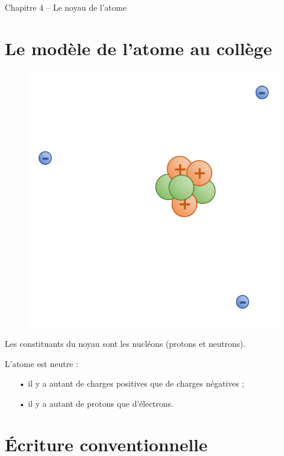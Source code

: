 \documentclass[12pt,a4paper]{article}
\begin{document}
\begin{header}
Chapitre 4 -- Le noyau de l'atome
\end{header}


\section{Le modèle de l'atome au collège}

\begin{figure}[h]
\center
\includegraphics[scale=0.85]{images/atome.png}
\end{figure}

Les constituants du noyau sont les nucléons (protons et neutrons).

L'atome est neutre :
\begin{itemize}
\item[•] il y a autant de charges positives que de charges négatives ;
\item[•] il y a autant de protons que d'électrons.
\end{itemize}

\section{Écriture conventionnelle}
\end{document}
